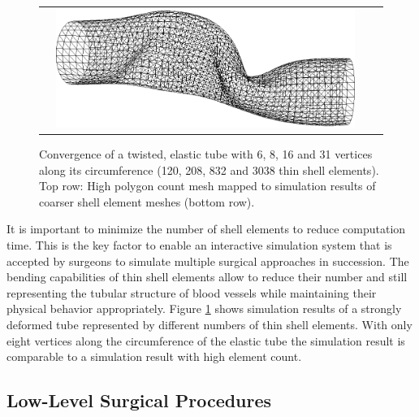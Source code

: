 \begin{figure}[tbh]
\begin{tabular}{cccc}
    &
    \includegraphics[width=0.48\columnwidth]{img/twist-31w-cg.png}
  \end{tabular}
  \caption{Convergence of a twisted, elastic tube with 6, 8, 16 and 31 vertices
  along its circumference (120, 208, 832 and 3038 thin shell elements). Top row: High polygon count mesh mapped to simulation results of coarser shell element meshes (bottom row).}
  \label{fig-convergence}
\end{figure}

It is important to minimize the number of shell elements to reduce computation time. This is the key factor to enable an interactive simulation system that is accepted by surgeons to simulate multiple surgical approaches in succession. The bending capabilities of thin shell elements allow to reduce their number and still representing the tubular structure of blood vessels while maintaining their physical behavior appropriately. Figure \ref{fig-convergence} shows simulation results of a strongly deformed tube represented by different numbers of thin shell elements. With only eight vertices along the circumference of the elastic tube the simulation result is comparable to a simulation result with high element count.

\subsection{Low-Level Surgical Procedures}

